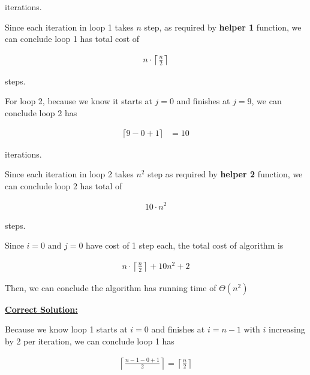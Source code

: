 \documentclass[12pt]{article}
\begin{document}
\begin{enumerate}[a.]
    iterations.

    \bigskip

    Since each iteration in loop 1 takes $n$ step, as required by \textbf{helper 1} function,
    we can conclude loop 1 has total cost of

    \begin{align}
        n \cdot \left\lceil \frac{n}{2} \right\rceil
    \end{align}

    steps.

    \bigskip

    For loop 2, because we know it starts at $j = 0$ and finishes at $j = 9$,
    we can conclude loop 2 has

    \begin{align}
        \lceil 9 - 0 + 1 \rceil &= 10
    \end{align}

    iterations.

    \bigskip

    Since each iteration in loop 2 takes $n^2$ step as required by \textbf{helper 2} function,
    we can conclude loop 2 has total of

    \begin{align}
        10 \cdot n^2
    \end{align}

    steps.

    \bigskip

    Since $i = 0$ and $j = 0$ have cost of 1 step each, the total cost of algorithm
    is

    \begin{align}
        n \cdot \left\lceil \frac{n}{2} \right\rceil + 10n^2 + 2
    \end{align}

    \bigskip

    Then, we can conclude the algorithm has running time of $\Theta(n^2)$

    \bigskip

    \begin{mdframed}
        \underline{\textbf{Correct Solution:}}

        \bigskip

        Because we know loop 1 starts at $i = 0$ and finishes at $i = n - 1$ with $i$
        increasing by 2 per iteration, we can conclude loop 1 has

        \setcounter{equation}{0}
        \begin{align}
            \left\lceil \frac{n - 1 - 0 + 1}{2} \right\rceil = \left\lceil \frac{n}{2} \right\rceil
        \end{align}


\end{mdframed}
\end{enumerate}
\end{document}
